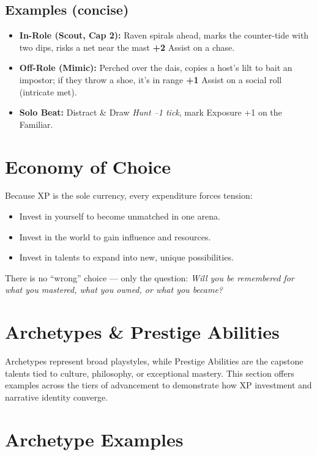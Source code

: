 \documentclass[12pt]{article}
\begin{document}
\subsection*{Examples (concise)}
\begin{itemize}
  \item \textbf{In-Role (Scout, Cap 2):} Raven spirals ahead, marks the counter-tide with two dips, risks a net near the mast \textrightarrow{} \textbf{+2} Assist on a chase.
  \item \textbf{Off-Role (Mimic):} Perched over the dais, copies a host’s lilt to bait an impostor; if they throw a shoe, it’s in range \textrightarrow{} \textbf{+1} Assist on a social roll (intricate met).
  \item \textbf{Solo Beat:} Distract \& Draw \textrightarrow{} \emph{Hunt --1 tick}, mark Exposure +1 on the Familiar.
\end{itemize}

\section{Economy of Choice}
Because XP is the sole currency, every expenditure forces tension:  

\begin{itemize}
  \item Invest in yourself to become unmatched in one arena.  
  \item Invest in the world to gain influence and resources.  
  \item Invest in talents to expand into new, unique possibilities.  
\end{itemize}

There is no “wrong” choice — only the question: \emph{Will you be remembered for what you mastered, what you owned, or what you became?}

\section{Archetypes \& Prestige Abilities}

Archetypes represent broad playstyles, while Prestige Abilities are the capstone talents tied to culture, philosophy, or exceptional mastery.  
This section offers examples across the tiers of advancement to demonstrate how XP investment and narrative identity converge.

\section{Archetype Examples}
\end{document}
